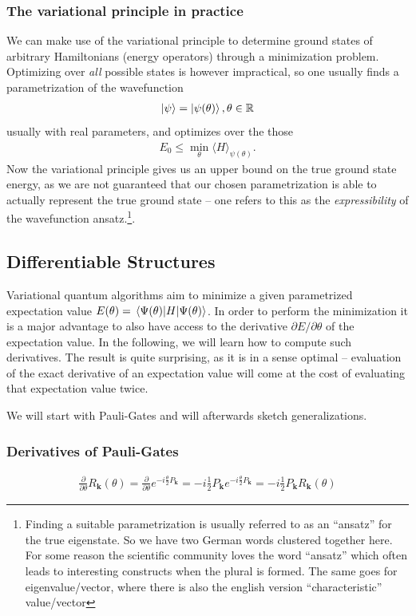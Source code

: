 \subsubsection*{The variational principle in practice}

We can make use of the variational principle to determine ground states of arbitrary Hamiltonians (energy operators) through a minimization problem. 
Optimizing over \textit{all} possible states is however impractical, so one usually finds a parametrization of the wavefunction
\begin{align}
    \ket{\psi} = \ket{\psi(\theta)}, \theta \in \mathbb{R}
\end{align}
usually with real parameters, and optimizes over the those
\begin{align}
    E_0 \leq \min_{\theta} \langle H \rangle_{\psi(\theta)}. 
\end{align}
Now the variational principle gives us an upper bound on the true ground state energy, as we are not guaranteed that our chosen parametrization is able to actually represent the true ground state -- one refers to this as the \textit{expressibility} of the wavefunction ansatz.\footnote{Finding a suitable parametrization is usually referred to as an ``ansatz'' for the true eigenstate. So we have two German words clustered together here. For some reason the scientific community loves the word ``ansatz'' which often leads to interesting constructs when the plural is formed. The same goes for eigenvalue/vector, where there is also the english version ``characteristic'' value/vector}.

\subsection{Differentiable Structures}

Variational quantum algorithms aim to minimize a given parametrized expectation value $E(\theta) = \expval{H}{\Psi(\theta)}$. In order to perform the minimization it is a major advantage to also have access to the derivative $\partial E/\partial\theta $ of the expectation value.
In the following, we will learn how to compute such derivatives.
The result is quite surprising, as it is in a sense optimal -- evaluation of the exact derivative of an expectation value will come at the cost of evaluating that expectation value twice.

We will start with Pauli-Gates and will afterwards sketch generalizations.

\subsubsection*{Derivatives of Pauli-Gates}
\begin{align}
    \frac{\partial}{\partial \theta} R_\mathbf{k}(\theta) = \frac{\partial}{\partial \theta}  e^{-i\frac{\theta}{2} P_\mathbf{k}} = -i\frac{1}{2} P_\mathbf{k}  e^{-i\frac{\theta}{2} P_\mathbf{k}} = -i\frac{1}{2} P_\mathbf{k} R_\mathbf{k}(\theta) 
\end{align}

